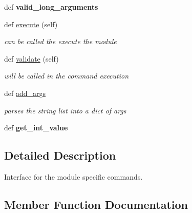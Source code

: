 \begin{DoxyCompactItemize}
def {\bfseries valid\+\_\+long\+\_\+arguments}
\item 
\mbox{\label{classmodules_1_1controller_1_1commands_1_1command_1_1_command_ab9855c5d591832fba524d22d46dc6a35}} 
def \mbox{\hyperlink{classmodules_1_1controller_1_1commands_1_1command_1_1_command_ab9855c5d591832fba524d22d46dc6a35}{execute}} (self)
\begin{DoxyCompactList}\small\item\em can be called the execute the module \end{DoxyCompactList}\item 
\mbox{\label{classmodules_1_1controller_1_1commands_1_1command_1_1_command_acf706e18eb5c831a2b28d9a92ad240e5}} 
def \mbox{\hyperlink{classmodules_1_1controller_1_1commands_1_1command_1_1_command_acf706e18eb5c831a2b28d9a92ad240e5}{validate}} (self)
\begin{DoxyCompactList}\small\item\em will be called in the command execution \end{DoxyCompactList}\item 
def \mbox{\hyperlink{classmodules_1_1controller_1_1commands_1_1command_1_1_command_acc5557c19cbaca3b0553d81e641218af}{add\+\_\+args}}
\begin{DoxyCompactList}\small\item\em parses the string list into a dict of args \end{DoxyCompactList}\item 
\mbox{\label{classmodules_1_1controller_1_1commands_1_1command_1_1_command_a239f678c143e676ef8ee27d67a7a8140}} 
def {\bfseries get\+\_\+int\+\_\+value}
\end{DoxyCompactItemize}


\subsection{Detailed Description}
Interface for the module specific commands. 

\subsection{Member Function Documentation}
\mbox{\label{classmodules_1_1controller_1_1commands_1_1command_1_1_command_acc5557c19cbaca3b0553d81e641218af}} 
